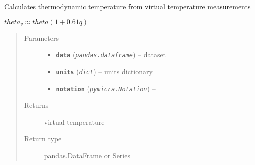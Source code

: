 \documentclass[a4paper,10pt,oneside]{sphinxmanual}
\begin{document}

\begin{fulllineitems}
\label{pymicra:pymicra.physics.theta_from_theta_v}
Calculates thermodynamic temperature from virtual temperature measurements

\(theta_v \approx theta (1 + 0.61 q)\)
\begin{quote}\begin{description}
\item[{Parameters}] \leavevmode\begin{itemize}
\item {} 
\textbf{\texttt{data}} (\emph{\texttt{pandas.dataframe}}) -- dataset

\item {} 
\textbf{\texttt{units}} (\emph{\texttt{dict}}) -- units dictionary

\item {} 
\textbf{\texttt{notation}} (\emph{\texttt{pymicra.Notation}}) -- 

\end{itemize}

\item[{Returns}] \leavevmode
virtual temperature

\item[{Return type}] \leavevmode
pandas.DataFrame or Series

\end{description}\end{quote}

\end{fulllineitems}

\end{document}
